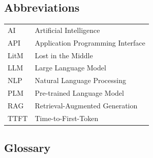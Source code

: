 
\subsection*{Abbreviations}

\begin{tabular}{ll}
AI          & Artificial Intelligence \\
API         & Application Programming Interface \\
LitM        & Lost in the Middle \\
LLM         & Large Language Model \\
NLP         & Natural Language Processing \\
PLM         & Pre-trained Language Model \\
RAG         & Retrieval-Augmented Generation \\
TTFT        & Time-to-First-Token \\
\end{tabular}

\vspace{0.6cm}

\subsection*{Glossary}

